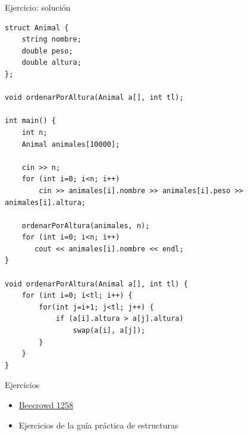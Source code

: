 \documentclass[12pt]{beamer}
\begin{document}
\begin{frame}[fragile]{Ejercicio: solución}
\begin{lstlisting}[basicstyle=\tiny]
struct Animal {
    string nombre;
    double peso;
    double altura;
};

void ordenarPorAltura(Animal a[], int tl);

int main() {
    int n;
    Animal animales[10000];

    cin >> n;
    for (int i=0; i<n; i++)
        cin >> animales[i].nombre >> animales[i].peso >> animales[i].altura;

    ordenarPorAltura(animales, n);
    for (int i=0; i<n; i++)
       cout << animales[i].nombre << endl;
}

void ordenarPorAltura(Animal a[], int tl) {
    for (int i=0; i<tl; i++) {
        for(int j=i+1; j<tl; j++) {
            if (a[i].altura > a[j].altura)
                swap(a[i], a[j]);
        }
    }
}
\end{lstlisting}
\end{frame}

\begin{frame}{Ejercicios}
    \begin{itemize}
        \item \href{https://judge.beecrowd.com/es/problems/view/1258}{Beecrowd 1258}
        \item Ejercicios de la guía práctica de estructuras
    \end{itemize}
\end{frame}
\end{document}
